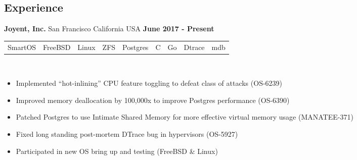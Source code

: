 \documentclass[resmargin,line,12pt]{res}
\begin{document}
{\begin{resume}
\vspace*{.20in}
{\color{Black}
  \vspace{-.13in}
  \section{\sc Experience}}
\color{black}

{\bf Joyent, Inc.} San Francisco California USA \hfill {\bf June 2017 - Present} \
\\
\begin{tabular}{l l l l l l l l l}
  SmartOS & FreeBSD & Linux & ZFS & Postgres & C & Go & Dtrace & mdb
\end{tabular}
\\
\vspace{-.16in}
\begin{itemize}
  \item Implemented ``hot-inlining'' CPU feature toggling to defeat class of attacks (OS-6239)
  \item Improved memory deallocation by 100,000x to improve Postgres performance (OS-6390)
  \item Patched Postgres to use Intimate Shared Memory for more effective virtual memory usage (MANATEE-371)
  \item Fixed long standing post-mortem DTrace bug in hypervisors (OS-5927)
    \item Participated in new OS bring up and testing (FreeBSD \& Linux)
\end{itemize}
\vspace{-.10in}



\end{resume}}
\end{document}
